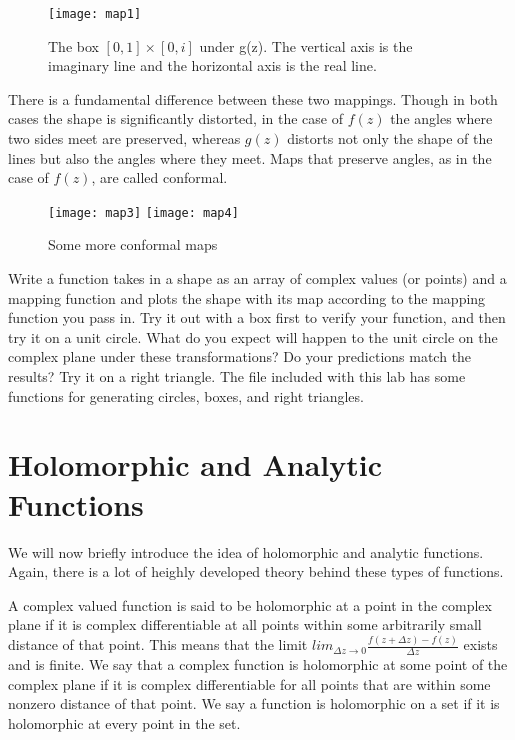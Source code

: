 \begin{figure}
\begin{center}
\texttt{[image: map1]}
\caption{The box $[0,1]\times[0,i]$ under g(z).  The vertical axis is the imaginary line and the horizontal axis is the real line.}
\end{center}
\end{figure}

There is a fundamental difference between these two mappings.  Though in both cases the shape is significantly distorted, in the case of $f(z)$ the angles where two sides meet are preserved, whereas $g(z)$ distorts not only the shape of the lines but also the angles where they meet.  Maps that preserve angles, as in the case of $f(z)$, are called conformal.

\begin{figure}
\begin{center}
\texttt{[image: map3]}
\texttt{[image: map4]}
\caption{Some more conformal maps}
\end{center}
\end{figure}

\begin{problem}
Write a function takes in a shape as an array of complex values (or points) and a mapping function and plots the shape with its map according to the mapping function you pass in. Try it out with a box first to verify your function, and then try it on a unit circle. What do you expect will happen to the unit circle on the complex plane under these transformations?  Do your predictions match the results?  Try it on a right triangle. The file included with this lab  has some functions for generating circles, boxes, and right triangles.
\end{problem}

\section*{Holomorphic and Analytic Functions}

We will now briefly introduce the idea of holomorphic and analytic functions. Again, there is a lot of heighly developed theory behind these types of functions.

A complex valued function is said to be holomorphic at a point in the complex plane if it is complex differentiable at all points within some arbitrarily small distance of that point. This means that the limit $lim_{\Delta z \to 0} \frac{f(z+\Delta z)-f(z)}{\Delta z}$ exists and is finite. We say that a complex function is holomorphic at some point of the complex plane if it is complex differentiable for all points that are within some nonzero distance of that point. We say a function is holomorphic on a set if it is holomorphic at every point in the set.

